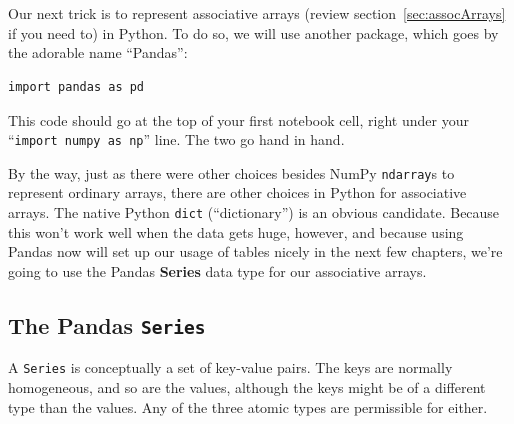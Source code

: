 

\chapter[Associative arrays in Python (1 of 3)]{\huge\selectfont{Associative
arrays in Python (1 of 3)}}
\label{ch:assocArraysInPython1}


Our next trick is to represent associative arrays (review
section~\ref{sec:assocArrays} if you need to) in Python. To do so, we will
use another package, which goes by the adorable name ``Pandas'':

\begin{Verbatim}[fontsize=\small,samepage=true,frame=single,framesep=3mm]
import pandas as pd
\end{Verbatim}

This code should go at the top of your first notebook cell, right under your
``\texttt{import numpy as np}'' line. The two go hand in hand.


By the way, just as there were other choices besides NumPy \texttt{ndarray}s to
represent ordinary arrays, there are other choices in Python for associative
arrays. The native Python \texttt{dict} (``dictionary'') is an obvious
candidate. Because this won't work well when the data gets huge, however, and
because using Pandas now will set up our usage of tables nicely in the next
few chapters, we're going to use the Pandas \textbf{Series} data type for our
associative arrays.


\section{The Pandas \texttt{Series}}
\label{sec:creatingSeries}


A \texttt{Series} is conceptually a set of key-value pairs. The keys are
normally homogeneous, and so are the values, although the keys might be of a
different type than the values. Any of the three atomic types are permissible
for either.


